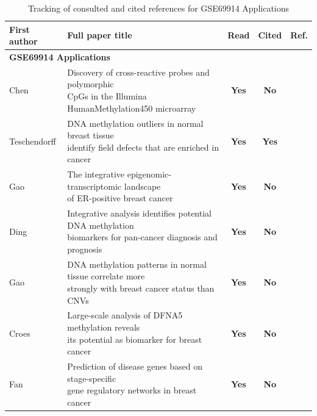 \documentclass[10pt]{extarticle}
\newcommand{\yes}{\cellcolor{yesgreen}\textbf{Yes}}
\newcommand{\noo}{\cellcolor{nored}\textbf{No}}
\begin{document}
\begin{table}[H]
    \centering
    \caption{Tracking of consulted and cited references for GSE69914 Applications}
    \label{tab:biblio-tracking}

    \begin{tabular}{|l|l|c|c|c|}
        \hline
        \textbf{First author} &
        \textbf{Full paper title} &
        \textbf{Read} &
        \textbf{Cited} &
        \textbf{Ref.} \\
        \hline
	\multicolumn{5}{|l|}{\cellcolor{catbg}\textbf{GSE69914 Applications}} \\
	\hline

	Chen &
	\makecell[l]{Discovery of cross-reactive probes and polymorphic\\ CpGs in the Illumina HumanMethylation450 microarray} &
	\yes & \noo & \cite{Chen2013} \\
	\hline

	Teschendorff &
	\makecell[l]{DNA methylation outliers in normal breast tissue\\ identify field defects that are enriched in cancer} &
	\yes & \yes & \cite{Teschendorff2016} \\
	\hline

	Gao &
	\makecell[l]{The integrative epigenomic-transcriptomic landscape\\ of ER-positive breast cancer} &
	\yes & \noo & \cite{Gao2015} \\
	\hline

	Ding &
	\makecell[l]{Integrative analysis identifies potential DNA methylation\\ biomarkers for pan-cancer diagnosis and prognosis} &
	\yes & \noo & \cite{Ding2019} \\
	\hline

	Gao &
	\makecell[l]{DNA methylation patterns in normal tissue correlate more\\ strongly with breast cancer status than CNVs} &
	\yes & \noo & \cite{Gao2018} \\
	\hline

	Croes &
	\makecell[l]{Large-scale analysis of DFNA5 methylation reveals\\ its potential as biomarker for breast cancer} &
	\yes & \noo & \cite{Croes2018} \\
	\hline

	Fan &
	\makecell[l]{Prediction of disease genes based on stage-specific\\ gene regulatory networks in breast cancer} &
	\yes & \noo & \cite{Fan2021} \\
	\hline


\end{tabular}
\end{table}
\end{document}
